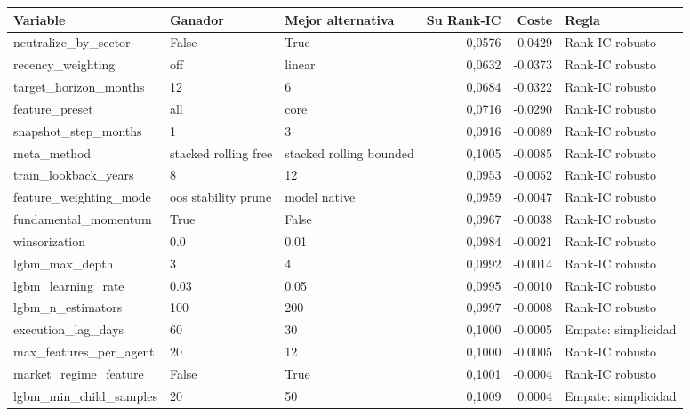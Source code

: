 \begin{tabular}{lllrrl}
\toprule
Variable & Ganador & Mejor alternativa & Su Rank-IC & Coste & Regla \\
\midrule
neutralize\_by\_sector & False & True & 0,0576 & -0,0429 & Rank-IC robusto \\
recency\_weighting & off & linear & 0,0632 & -0,0373 & Rank-IC robusto \\
target\_horizon\_months & 12 & 6 & 0,0684 & -0,0322 & Rank-IC robusto \\
feature\_preset & all & core & 0,0716 & -0,0290 & Rank-IC robusto \\
snapshot\_step\_months & 1 & 3 & 0,0916 & -0,0089 & Rank-IC robusto \\
meta\_method & stacked rolling free & stacked rolling bounded & 0,1005 & -0,0085 & Rank-IC robusto \\
train\_lookback\_years & 8 & 12 & 0,0953 & -0,0052 & Rank-IC robusto \\
feature\_weighting\_mode & oos stability prune & model native & 0,0959 & -0,0047 & Rank-IC robusto \\
fundamental\_momentum & True & False & 0,0967 & -0,0038 & Rank-IC robusto \\
winsorization & 0.0 & 0.01 & 0,0984 & -0,0021 & Rank-IC robusto \\
lgbm\_max\_depth & 3 & 4 & 0,0992 & -0,0014 & Rank-IC robusto \\
lgbm\_learning\_rate & 0.03 & 0.05 & 0,0995 & -0,0010 & Rank-IC robusto \\
lgbm\_n\_estimators & 100 & 200 & 0,0997 & -0,0008 & Rank-IC robusto \\
execution\_lag\_days & 60 & 30 & 0,1000 & -0,0005 & Empate: simplicidad \\
max\_features\_per\_agent & 20 & 12 & 0,1000 & -0,0005 & Rank-IC robusto \\
market\_regime\_feature & False & True & 0,1001 & -0,0004 & Rank-IC robusto \\
lgbm\_min\_child\_samples & 20 & 50 & 0,1009 & 0,0004 & Empate: simplicidad \\
\bottomrule
\end{tabular}
